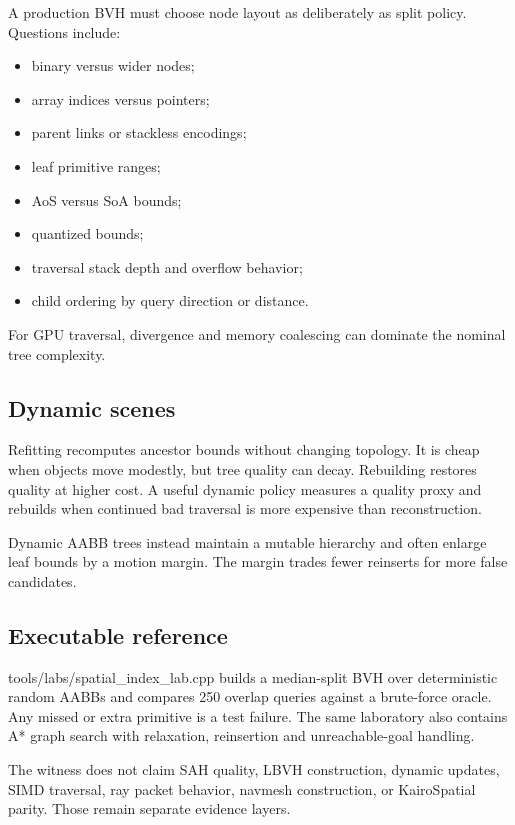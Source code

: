 A production BVH must choose node layout as deliberately as split policy. Questions include:

\begin{itemize}
\tightlist
\item
  binary versus wider nodes;
\item
  array indices versus pointers;
\item
  parent links or stackless encodings;
\item
  leaf primitive ranges;
\item
  AoS versus SoA bounds;
\item
  quantized bounds;
\item
  traversal stack depth and overflow behavior;
\item
  child ordering by query direction or distance.
\end{itemize}

For GPU traversal, divergence and memory coalescing can dominate the nominal tree complexity.

\subsection{Dynamic scenes}\label{appendix-5653a7aea6bb-dynamic-scenes}

Refitting recomputes ancestor bounds without changing topology. It is cheap when objects move modestly, but tree quality can decay. Rebuilding restores quality at higher cost. A useful dynamic policy measures a quality proxy and rebuilds when continued bad traversal is more expensive than reconstruction.

Dynamic AABB trees instead maintain a mutable hierarchy and often enlarge leaf bounds by a motion margin. The margin trades fewer reinserts for more false candidates.

\subsection{Executable reference}\label{appendix-5653a7aea6bb-executable-reference}

tools/labs/spatial\_index\_lab.cpp builds a median-split BVH over deterministic random AABBs and compares 250 overlap queries against a brute-force oracle. Any missed or extra primitive is a test failure. The same laboratory also contains A* graph search with relaxation, reinsertion and unreachable-goal handling.

The witness does not claim SAH quality, LBVH construction, dynamic updates, SIMD traversal, ray packet behavior, navmesh construction, or KairoSpatial parity. Those remain separate evidence layers.

